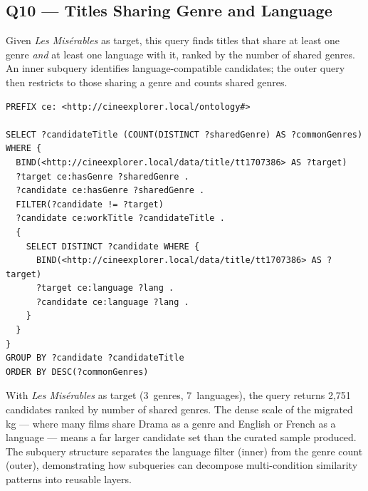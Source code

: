 \subsection{Q10 — Titles Sharing Genre and Language}

Given \emph{Les Mis\'{e}rables} as target, this query finds titles that share at least one genre \emph{and} at least one language with it, ranked by the number of shared genres. An inner subquery identifies language-compatible candidates; the outer query then restricts to those sharing a genre and counts shared genres.

\begin{lstlisting}[language=SPARQL]
PREFIX ce: <http://cineexplorer.local/ontology#>

SELECT ?candidateTitle (COUNT(DISTINCT ?sharedGenre) AS ?commonGenres)
WHERE {
  BIND(<http://cineexplorer.local/data/title/tt1707386> AS ?target)
  ?target ce:hasGenre ?sharedGenre .
  ?candidate ce:hasGenre ?sharedGenre .
  FILTER(?candidate != ?target)
  ?candidate ce:workTitle ?candidateTitle .
  {
    SELECT DISTINCT ?candidate WHERE {
      BIND(<http://cineexplorer.local/data/title/tt1707386> AS ?target)
      ?target ce:language ?lang .
      ?candidate ce:language ?lang .
    }
  }
}
GROUP BY ?candidate ?candidateTitle
ORDER BY DESC(?commonGenres)
\end{lstlisting}

With \emph{Les Mis\'{e}rables} as target (3~genres, 7~languages), the query returns 2{,}751 candidates ranked by number of shared genres. The dense scale of the migrated \ac{kg} --- where many films share Drama as a genre and English or French as a language --- means a far larger candidate set than the curated sample produced. The subquery structure separates the language filter (inner) from the genre count (outer), demonstrating how subqueries can decompose multi-condition similarity patterns into reusable layers.
